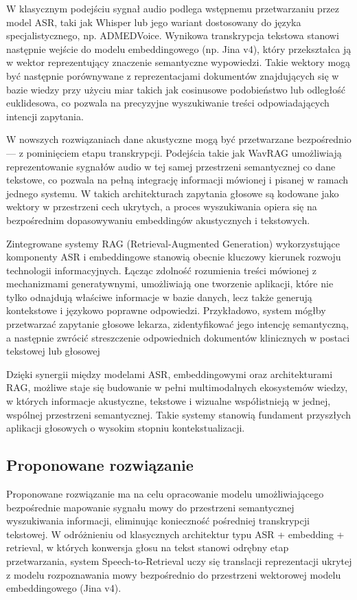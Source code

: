 W klasycznym podejściu sygnał audio podlega wstępnemu przetwarzaniu przez model ASR, taki jak Whisper lub jego wariant dostosowany do języka specjalistycznego, np. ADMEDVoice. Wynikowa transkrypcja tekstowa stanowi następnie wejście do modelu embeddingowego (np. Jina v4), który przekształca ją w wektor reprezentujący znaczenie semantyczne wypowiedzi. Takie wektory mogą być następnie porównywane z reprezentacjami dokumentów znajdujących się w bazie wiedzy przy użyciu miar takich jak cosinusowe podobieństwo lub odległość euklidesowa, co pozwala na precyzyjne wyszukiwanie treści odpowiadających intencji zapytania.

W nowszych rozwiązaniach dane akustyczne mogą być przetwarzane bezpośrednio — z pominięciem etapu transkrypcji. Podejścia takie jak WavRAG umożliwiają reprezentowanie sygnałów audio w tej samej przestrzeni semantycznej co dane tekstowe, co pozwala na pełną integrację informacji mówionej i pisanej w ramach jednego systemu. W takich architekturach zapytania głosowe są kodowane jako wektory w przestrzeni cech ukrytych, a proces wyszukiwania opiera się na bezpośrednim dopasowywaniu embeddingów akustycznych i tekstowych.

Zintegrowane systemy RAG (Retrieval-Augmented Generation) wykorzystujące komponenty ASR i embeddingowe stanowią obecnie kluczowy kierunek rozwoju technologii informacyjnych. Łącząc zdolność rozumienia treści mówionej z mechanizmami generatywnymi, umożliwiają one tworzenie aplikacji, które nie tylko odnajdują właściwe informacje w bazie danych, lecz także generują kontekstowe i językowo poprawne odpowiedzi. Przykładowo, system mógłby przetwarzać zapytanie głosowe lekarza, zidentyfikować jego intencję semantyczną, a następnie zwrócić streszczenie odpowiednich dokumentów klinicznych w postaci tekstowej lub głosowej

Dzięki synergii między modelami ASR, embeddingowymi oraz architekturami RAG, możliwe staje się budowanie w pełni multimodalnych ekosystemów wiedzy, w których informacje akustyczne, tekstowe i wizualne współistnieją w jednej, wspólnej przestrzeni semantycznej. Takie systemy stanowią fundament przyszłych aplikacji głosowych o wysokim stopniu kontekstualizacji.



\subsection{Proponowane rozwiązanie}
Proponowane rozwiązanie ma na celu opracowanie modelu umożliwiającego bezpośrednie mapowanie sygnału mowy do przestrzeni semantycznej wyszukiwania informacji, eliminując konieczność pośredniej transkrypcji tekstowej. W odróżnieniu od klasycznych architektur typu ASR + embedding + retrieval, w których konwersja głosu na tekst stanowi odrębny etap przetwarzania, system Speech-to-Retrieval uczy się translacji reprezentacji ukrytej z modelu rozpoznawania mowy bezpośrednio do przestrzeni wektorowej modelu embeddingowego (Jina v4).

